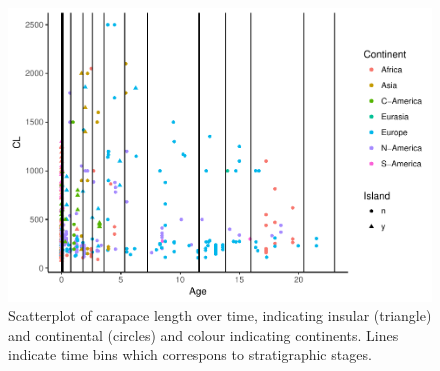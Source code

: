 \begin{figure}[htbp]
	\centering
	\includegraphics{MA_JJ_files/figure-latex/overview.pdf}
	\caption{Scatterplot of carapace length over time, indicating insular (triangle) and
		continental (circles) and colour indicating continents. Lines indicate time
		bins which correspons to stratigraphic stages.}
	\label{fig:bins}
\end{figure}
